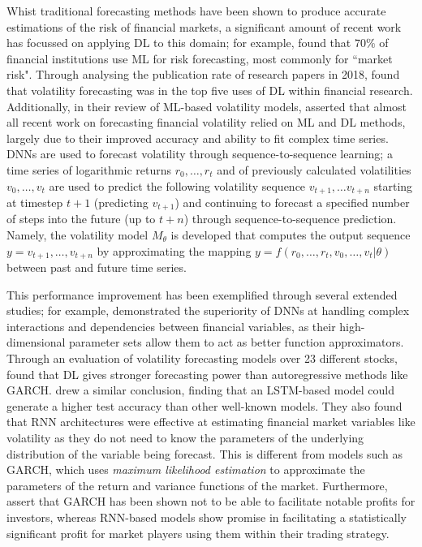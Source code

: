 \documentclass[a4paper, 11pt]{report}
\begin{document}
    Whist traditional forecasting methods have been shown to produce accurate estimations of the risk of financial markets, a significant amount of recent work has focussed on applying DL to this domain; for example, \citet{chartis-2019} found that $70\%$ of financial institutions use ML for risk forecasting, most commonly for ``market risk". Through analysing the publication rate of research papers in 2018, \citet{sezer-2019} found that volatility forecasting was in the top five uses of DL within financial research. Additionally, in their review of ML-based volatility models, \citet{ge-2022} asserted that almost all recent work on forecasting financial volatility relied on ML and DL methods, largely due to their improved accuracy and ability to fit complex time series. DNNs are used to forecast volatility through sequence-to-sequence learning; a time series of logarithmic returns $r_0, \dots, r_t$ and of previously calculated volatilities $v_0, \dots, v_t$ are used to predict the following volatility sequence $v_{t+1}, \ldots v_{t+n}$ starting at timestep $t+1$ (predicting $v_{t+1}$) and continuing to forecast a specified number of steps into the future (up to $t+n$) through sequence-to-sequence prediction. Namely, the volatility model $M_{\theta}$ is developed that computes the output sequence $y = v_{t+1}, \dots, v_{t+n}$ by approximating the mapping $y = f( r_0, \dots, r_t, v_0, \dots, v_t \lvert \theta )$ between past and future time series.
    
    This performance improvement has been exemplified through several extended studies; for example, \citet{zhang-2022} demonstrated the superiority of DNNs at handling complex interactions and dependencies between financial variables, as their high-dimensional parameter sets allow them to act as better function approximators. Through an evaluation of volatility forecasting models over 23 different stocks, \citet{rahimikia-2020} found that DL gives stronger forecasting power than autoregressive methods like GARCH. \citet{rodikov-2022} drew a similar conclusion, finding that an LSTM-based model could generate a higher test accuracy than other well-known models. They also found that RNN architectures were effective at estimating financial market variables like volatility as they do not need to know the parameters of the underlying distribution of the variable being forecast. This is different from models such as GARCH, which uses \emph{maximum likelihood estimation} to approximate the parameters of the return and variance functions of the market. Furthermore, \citet{tino-2001} assert that GARCH has been shown not to be able to facilitate notable profits for investors, whereas RNN-based models show promise in facilitating a statistically significant profit for market players using them within their trading strategy. 
\end{document}
